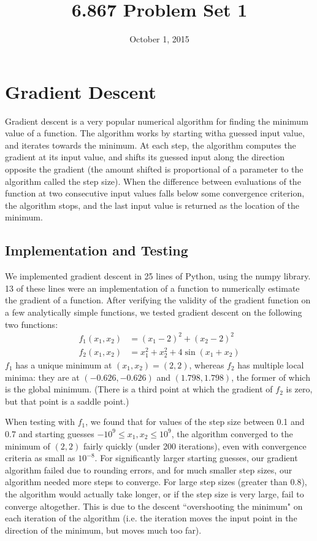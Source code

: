 \documentclass{article}
\title{6.867 Problem Set 1}
\date{October 1, 2015}
\begin{document}
\maketitle
\section{Gradient Descent}
Gradient descent is a very popular numerical algorithm for finding the minimum value of a function. The algorithm works by starting witha guessed input value, and iterates towards the minimum. At each step, the algorithm computes the gradient at its input value, and shifts its guessed input along the direction opposite the gradient (the amount shifted is proportional of a parameter to the algorithm called the step size). When the difference between evaluations of the function at two consecutive input values falls below some convergence criterion, the algorithm stops, and the last input value is returned as the location of the minimum.

\subsection{Implementation and Testing}
We implemented gradient descent in 25 lines of Python, using the numpy library. 13 of these lines were an implementation of a function to numerically estimate the gradient of a function. After verifying the validity of the gradient function on a few analytically simple functions, we tested gradient descent on the following two functions:
\begin{align*}
f_1(x_1, x_2) &= (x_1-2)^2 + (x_2-2)^2\\
f_2(x_1, x_2) &= x_1^2 + x_2^2 + 4\sin (x_1 + x_2)
\end{align*}
$f_1$ has a unique minimum at $(x_1, x_2) = (2,2)$, whereas $f_2$ has multiple local minima: they are at $(-0.626, -0.626)$ and $(1.798, 1.798)$, the former of which is the global minimum. (There is a third point at which the gradient of $f_2$ is zero, but that point is a saddle point.)

When testing with $f_1$, we found that for values of the step size between 0.1 and 0.7 and starting guesses $-10^{9} \le x_1, x_2 \le 10^{9}$, the algorithm converged to the minimum of $(2,2)$ fairly quickly (under 200 iterations), even with convergence criteria as small as $10^{-8}$. For significantly larger starting guesses, our gradient algorithm failed due to rounding errors, and for much smaller step sizes, our algorithm needed more steps to converge. For large step sizes (greater than $0.8$), the algorithm would actually take longer, or if the step size is very large, fail to converge altogether. This is due to the descent ``overshooting the minimum" on each iteration of the algorithm (i.e. the iteration moves the input point in the direction of the minimum, but moves much too far).
\end{document}
